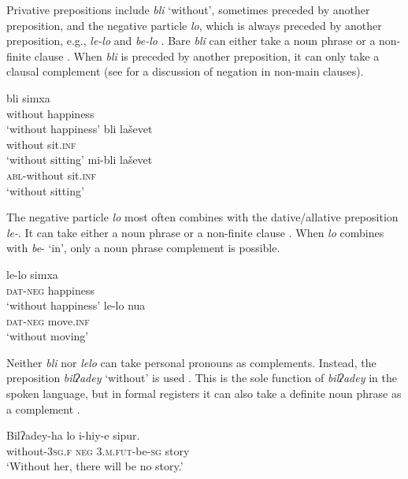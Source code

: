 \documentclass[output=paper,colorlinks,citecolor=brown]{langscibook}
\begin{document}
Privative prepositions include \textit{bli} ‘without’, sometimes preceded by another preposition, and the negative particle \textit{lo}, which is always preceded by another preposition, e.g., \textit{le-lo} and \textit{be-lo} \citep[68]{Tzivoni1993}. Bare \textit{bli} can either take a noun phrase  or a non-finite clause . When \textit{bli} is preceded by another preposition, it can only take a clausal complement  (see  for a discussion of negation in non-main clauses).

\ea\label{ex:heb:31}
    \ea\label{ex:heb:31a}
        \gll bli simxa\\
            without happiness\\
        \glt ‘without happiness’
    \ex\label{ex:heb:31b}
        \gll bli laševet\\
            without sit.\textsc{inf}\\
        \glt ‘without sitting’
    \ex\label{ex:heb:31c}
        \gll mi-bli laševet\\
             \textsc{abl}{}-without sit.\textsc{inf}\\
        \glt ‘without sitting’ \citep[68]{Tzivoni1993}
    \z 
\z 

The negative particle \textit{lo} most often combines with the dative/allative preposition \textit{le-}. It can take either a noun phrase  or a non-finite clause . When \textit{lo} combines with \textit{be}{}- ‘in’, only a noun phrase complement is possible.

\ea\label{ex:heb:32}
    \ea\label{ex:heb:32a}
        \gll le-lo simxa\\
            \textsc{dat{}-neg} happiness\\
        \glt ‘without happiness’
    \ex\label{ex:heb:32b}
        \gll le-lo nua\\
            \textsc{dat{}-neg} move.\textsc{inf}\\
        \glt ‘without moving’ \citep[68]{Tzivoni1993}
    \z 
\z 

Neither \textit{bli} nor \textit{lelo} can take personal pronouns as complements. Instead, the preposition \textit{bilʔadey} ‘without’ is used . This is the sole function of \textit{bilʔadey} in the spoken language, but in formal registers it can also take a definite noun phrase as a complement \citep[74]{Tzivoni1993}. 

\ea\label{ex:heb:33}
    \gll Bilʔadey{}-ha lo i-hiy-e sipur.\\
         without-3\textsc{sg.f} \textsc{neg} \textsc{3.m.fut-}be-\textsc{sg} story\\
    \glt ‘Without her, there will be no story.’ \citep[74]{Tzivoni1993}
\z 
\end{document}
